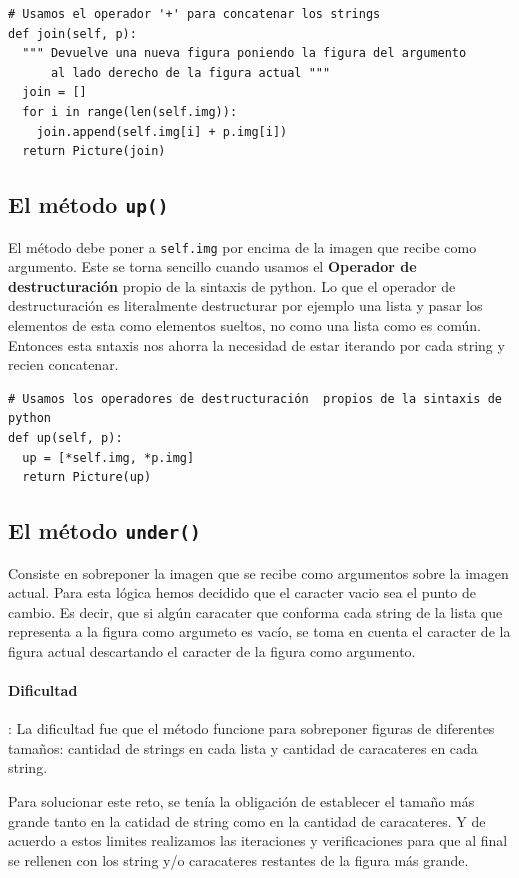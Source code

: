 \documentclass[10pt, a4paper]{article}
\newcommand{\mintpython}[1]{\texttt{#1}}
\begin{document}
\begin{verbatim}
# Usamos el operador '+' para concatenar los strings
def join(self, p):
  """ Devuelve una nueva figura poniendo la figura del argumento 
      al lado derecho de la figura actual """
  join = []
  for i in range(len(self.img)):
    join.append(self.img[i] + p.img[i])
  return Picture(join)
\end{verbatim}

\subsection{El método \mintpython{up()}}
El método debe poner a \mintpython{self.img} por encima de la imagen que recibe como argumento. Este se torna sencillo cuando usamos el \textbf{Operador de destructuración} propio de la sintaxis de python. 
\singlespacing
Lo que el operador de destructuración es literalmente destructurar por ejemplo una lista y pasar los elementos de esta como elementos sueltos, no como una lista como es común. Entonces esta sntaxis nos ahorra la necesidad de estar iterando por cada string y recien concatenar.

\begin{verbatim}
# Usamos los operadores de destructuración  propios de la sintaxis de python
def up(self, p):
  up = [*self.img, *p.img]
  return Picture(up)
\end{verbatim}

\subsection{El método \mintpython{under()}}
Consiste en sobreponer la imagen que se recibe como argumentos sobre la imagen actual. Para esta lógica hemos decidido que el caracter vacio sea el punto de cambio. Es decir, que si algún caracater que conforma cada string de la lista que representa a la figura como argumeto es vacío, se toma en cuenta el caracter de la figura actual descartando el caracter de la figura como argumento.

\paragraph{Dificultad}: La dificultad fue que el método funcione para sobreponer figuras de diferentes tamaños: cantidad de strings en cada lista y cantidad de caracateres en cada string.

Para solucionar este reto, se tenía la obligación de establecer el tamaño más grande tanto en la catidad de string como en la cantidad de caracateres. Y de acuerdo a estos limites realizamos las iteraciones y verificaciones para que al final se rellenen con los string y/o caracateres restantes de la figura más grande.
\end{document}
